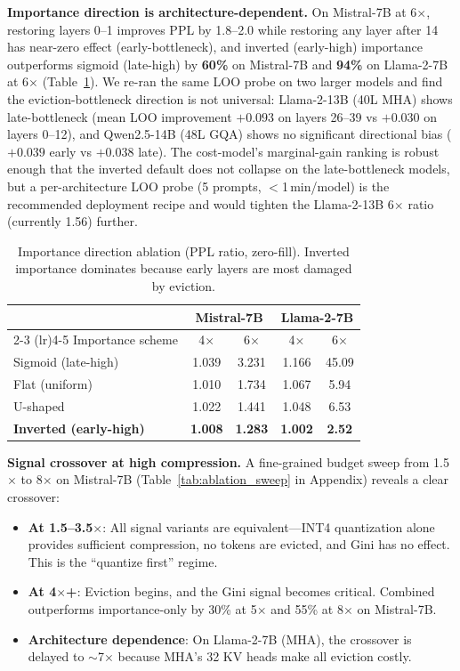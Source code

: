 \documentclass{article}
\begin{document}
\textbf{Importance direction is architecture-dependent.}
On Mistral-7B at 6$\times$, restoring layers 0--1 improves PPL by 1.8--2.0 while restoring any layer after 14 has near-zero effect (early-bottleneck), and inverted (early-high) importance outperforms sigmoid (late-high) by \textbf{60\%} on Mistral-7B and \textbf{94\%} on Llama-2-7B at 6$\times$ (Table~\ref{tab:importance_direction}).
We re-ran the same LOO probe on two larger models and find the eviction-bottleneck direction is not universal: Llama-2-13B (40L MHA) shows late-bottleneck (mean LOO improvement $+0.093$ on layers 26--39 vs $+0.030$ on layers 0--12), and Qwen2.5-14B (48L GQA) shows no significant directional bias ($+0.039$ early vs $+0.038$ late).
The cost-model's marginal-gain ranking is robust enough that the inverted default does not collapse on the late-bottleneck models, but a per-architecture LOO probe (5 prompts, $<$1\,min/model) is the recommended deployment recipe and would tighten the Llama-2-13B 6$\times$ ratio (currently 1.56) further.

\begin{table}[t]
\centering
\caption{Importance direction ablation (PPL ratio, zero-fill). Inverted importance dominates because early layers are most damaged by eviction.}
\label{tab:importance_direction}
\small
\setlength{\tabcolsep}{3pt}
\begin{tabular}{@{}lcccc@{}}
\toprule
& \multicolumn{2}{c}{Mistral-7B} & \multicolumn{2}{c}{Llama-2-7B} \\
\cmidrule(lr){2-3} \cmidrule(lr){4-5}
Importance scheme & 4$\times$ & 6$\times$ & 4$\times$ & 6$\times$ \\
\midrule
Sigmoid (late-high) & 1.039 & 3.231 & 1.166 & 45.09 \\
Flat (uniform)      & 1.010 & 1.734 & 1.067 & 5.94 \\
U-shaped            & 1.022 & 1.441 & 1.048 & 6.53 \\
\textbf{Inverted (early-high)} & \textbf{1.008} & \textbf{1.283} & \textbf{1.002} & \textbf{2.52} \\
\bottomrule
\end{tabular}
\vspace{-0.05in}
\end{table}

\textbf{Signal crossover at high compression.}
A fine-grained budget sweep from 1.5$\times$ to 8$\times$ on Mistral-7B (Table~\ref{tab:ablation_sweep} in Appendix) reveals a clear crossover:
\begin{itemize}
    \item \textbf{At 1.5--3.5$\times$}: All signal variants are equivalent---INT4 quantization alone provides sufficient compression, no tokens are evicted, and Gini has no effect. This is the ``quantize first'' regime.
    \item \textbf{At 4$\times$+}: Eviction begins, and the Gini signal becomes critical.
    Combined outperforms importance-only by 30\% at 5$\times$ and 55\% at 8$\times$ on Mistral-7B.
    \item \textbf{Architecture dependence}: On Llama-2-7B (MHA), the crossover is delayed to $\sim$7$\times$ because MHA's 32 KV heads make all eviction costly.
\end{itemize}
\end{document}
